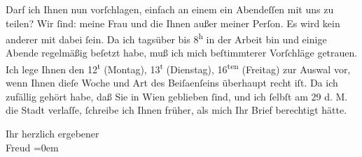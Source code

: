 \pstart
           Darf ich Ihnen nun vorſchlagen, einfach an einem \label{K_L03888-2v}\label{K_L03888-2} ein
               Abendeſſen mit uns zu teilen? Wir{ }ſind: meine Frau und die Ihnen \label{K_L03888-3v}\label{K_L03888-3} außer meiner
               Perſon. Es wird kein anderer mit dabei{ }ſein. Da ich tagsüber bis 8\textsuperscript{h} in der Arbeit bin und einige Abende regelmäßig beſetzt
               habe, muß ich mich beſtimmterer Vorſchläge getrauen. Ich lege Ihnen den 12\textsuperscript{t} (Montag), 13\textsuperscript{t} (Dienstag), 16\textsuperscript{ten}
                  (Freitag) zur Auswal vor, wenn Ihnen dieſe Woche und Art des Beiſa{\geminationm}enſeins überhaupt recht iſt. Da ich zufällig gehört
               habe, daß Sie in Wien geblieben{ }ſind, und ich{ }ſelbſt am 29 d. M. die Stadt verlaſſe,{ }ſchreibe ich Ihnen früher, als
               mich Ihr Brief berechtigt hätte.\pend
           
\pstart
           Ihr herzlich ergebener{\\[\baselineskip]}\spacefill\mbox{Freud}\pend
           \leftskip=0em{}\endnumbering{}
\begin{anhang}
\end{anhang}\newcommand{\dateiname}{L03888}\newcommand{\titel}{Sigmund Freud an Arthur Schnitzler, 8. 6. 1922}\newcommand{\editorInnen}{Selma Jahnke und Martin Anton Müller}
